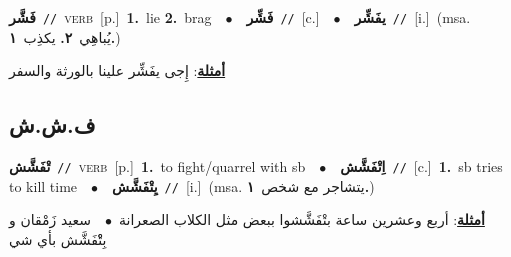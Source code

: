 \documentclass[10pt,a4paper,twoside]{article} %
\begin{document}
\begin{multicols}{2}
{\setlength\topsep{0pt}\textbf{\foreignlanguage{arabic}{فَشَّر}}\ {\color{gray}\texttt{//}\color{black}}\ \textsc{verb}\ [p.]\ \textbf{1.}~lie  \textbf{2.}~brag\ \ $\bullet$\ \ \setlength\topsep{0pt}\textbf{\foreignlanguage{arabic}{فَشِّر}}\ {\color{gray}\texttt{//}\color{black}}\ [c.]\ \ $\bullet$\ \ \setlength\topsep{0pt}\textbf{\foreignlanguage{arabic}{يفَشِّر}}\ {\color{gray}\texttt{//}\color{black}}\ [i.]\ \color{gray}(msa. \foreignlanguage{arabic}{يُباهِي}~\foreignlanguage{arabic}{\textbf{٢.}}  \foreignlanguage{arabic}{يكذِب}~\foreignlanguage{arabic}{\textbf{١.}})\color{black}\  \begin{flushright}\color{gray}\foreignlanguage{arabic}{\textbf{\underline{\foreignlanguage{arabic}{أمثلة}}}: إِجى يفَشِّر علينا بالورثة والسفر}\end{flushright}\color{black}} \vspace{2mm}

\vspace{-3mm}
\subsection*{\color{blue}\foreignlanguage{arabic}{ف.ش.ش}\color{blue}{}} 

{\setlength\topsep{0pt}\textbf{\foreignlanguage{arabic}{تْفَشَّش}}\ {\color{gray}\texttt{//}\color{black}}\ \textsc{verb}\ [p.]\ \textbf{1.}~to fight/quarrel with sb\ \ $\bullet$\ \ \setlength\topsep{0pt}\textbf{\foreignlanguage{arabic}{اِتْفَشَّش}}\ {\color{gray}\texttt{//}\color{black}}\ [c.]\ \textbf{1.}~sb tries to kill time\ \ $\bullet$\ \ \setlength\topsep{0pt}\textbf{\foreignlanguage{arabic}{يِتْفَشَّش}}\ {\color{gray}\texttt{//}\color{black}}\ [i.]\ \color{gray}(msa. \foreignlanguage{arabic}{يتشاجر مع شخص}~\foreignlanguage{arabic}{\textbf{١.}})\color{black}\  \begin{flushright}\color{gray}\foreignlanguage{arabic}{\textbf{\underline{\foreignlanguage{arabic}{أمثلة}}}: أربع وعشرين ساعة بتْفَشَّشوا ببعض مثل الكلاب الصعرانة\ $\bullet$\ \  سعيد زَمْقان و بِتْْفَشَّش بأي شي}\end{flushright}\color{black}} \vspace{2mm}


\end{multicols}
\end{document}
